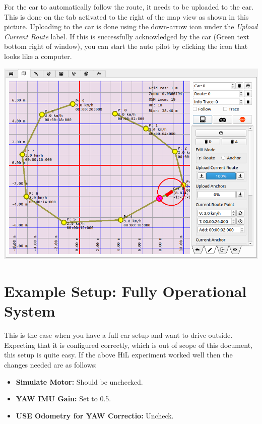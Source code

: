 \documentclass[12pt]{article} %
\begin{document}
\noindent\begin{minipage}{0.5\linewidth} For the car to automatically
follow the route, it needs to be uploaded to the car.  This is done on
the tab activated to the right of the map view as shown in this
picture.  Uploading to the car is done using the down-arrow icon under
the {\em Upload Current Route} label.  If this is successfully
acknowledged by the car (Green text bottom right of window), you can
start the auto pilot by clicking the icon that looks like a computer.
\end{minipage}
\begin{minipage}{0.5\linewidth}
\noindent \includegraphics[width=\textwidth]{./screens/autopilotdrive2.png}
\end{minipage}


\section{Example Setup: Fully Operational System}

This is the case when you have a full car setup and want to drive
outside. Expecting that it is configured correctly, which is out of
scope of this document, this setup is quite easy.
If the above HiL experiment worked well then the changes needed are as follows:
\begin{itemize}
\item {\bf Simulate Motor:} Should be unchecked. 
\item {\bf YAW IMU Gain:} Set to 0.5.
\item {\bf USE Odometry for YAW Correctio:} Uncheck. 
\end{itemize} 
\end{document}
